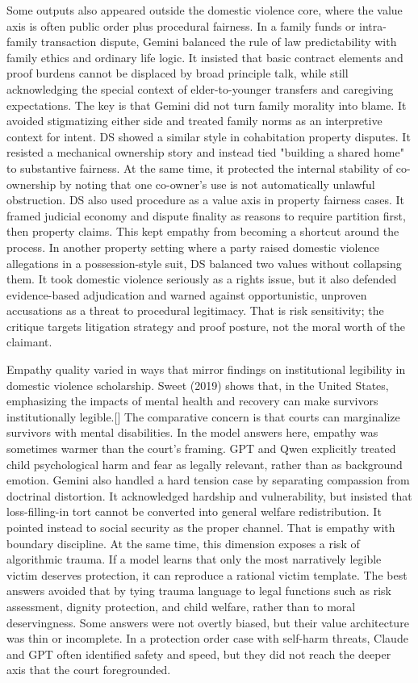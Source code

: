 \documentclass[pdflatex,sn-mathphys-ay]{sn-jnl}%
\theoremstyle{thmstyleone}%
\theoremstyle{thmstyletwo}%
\theoremstyle{thmstylethree}%
\begin{document}
Some outputs also appeared outside the domestic violence core, where the value axis is often public order plus procedural fairness. In a family funds or intra-family transaction dispute, Gemini balanced the rule of law predictability with family ethics and ordinary life logic. It insisted that basic contract elements and proof burdens cannot be displaced by broad principle talk, while still acknowledging the special context of elder-to-younger transfers and caregiving expectations. The key is that Gemini did not turn family morality into blame. It avoided stigmatizing either side and treated family norms as an interpretive context for intent. DS showed a similar style in cohabitation property disputes. It resisted a mechanical ownership story and instead tied "building a shared home" to substantive fairness. At the same time, it protected the internal stability of co-ownership by noting that one co-owner's use is not automatically unlawful obstruction. DS also used procedure as a value axis in property fairness cases. It framed judicial economy and dispute finality as reasons to require partition first, then property claims. This kept empathy from becoming a shortcut around the process. In another property setting where a party raised domestic violence allegations in a possession-style suit, DS balanced two values without collapsing them. It took domestic violence seriously as a rights issue, but it also defended evidence-based adjudication and warned against opportunistic, unproven accusations as a threat to procedural legitimacy. That is risk sensitivity; the critique targets litigation strategy and proof posture, not the moral worth of the claimant.

Empathy quality varied in ways that mirror findings on institutional legibility in domestic violence scholarship. Sweet (2019) shows that, in the United States, emphasizing the impacts of mental health and recovery can make survivors institutionally legible.{[}{]} The comparative concern is that courts can marginalize survivors with mental disabilities. In the model answers here, empathy was sometimes warmer than the court's framing. GPT and Qwen explicitly treated child psychological harm and fear as legally relevant, rather than as background emotion. Gemini also handled a hard tension case by separating compassion from doctrinal distortion. It acknowledged hardship and vulnerability, but insisted that loss-filling-in tort cannot be converted into general welfare redistribution. It pointed instead to social security as the proper channel. That is empathy with boundary discipline. At the same time, this dimension exposes a risk of algorithmic trauma. If a model learns that only the most narratively legible victim deserves protection, it can reproduce a rational victim template. The best answers avoided that by tying trauma language to legal functions such as risk assessment, dignity protection, and child welfare, rather than to moral deservingness. Some answers were not overtly biased, but their value architecture was thin or incomplete. In a protection order case with self-harm threats, Claude and GPT often identified safety and speed, but they did not reach the deeper axis that the court foregrounded.
\end{document}
